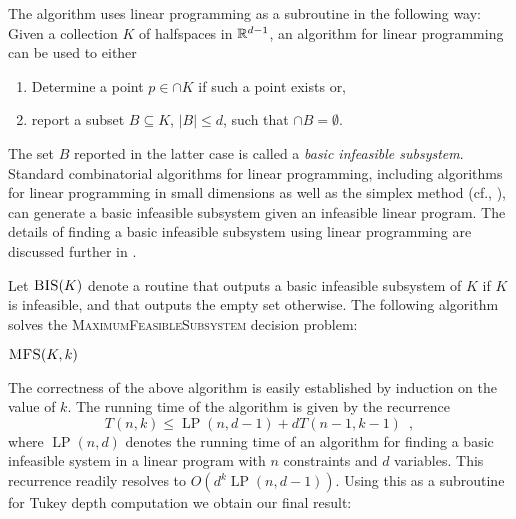 \documentclass[charterfonts,lotsofwhite]{patmorin}
\DeclareMathOperator{\lp}{LP}
\begin{document}
The algorithm uses linear programming as a subroutine in the following
way:  Given a collection $K$ of halfspaces in $\mathbb{R}^{d-1}$, an algorithm
for linear programming can be used to either
\begin{enumerate}
\item Determine a point $p\in\cap K$ if such a point exists or,
\item report a subset $B\subseteq K$, $|B|\le d$, such that 
	$\cap B=\emptyset$.
\end{enumerate}
The set $B$ reported in the latter case is called a \emph{basic
infeasible subsystem}.  Standard combinatorial algorithms for linear
programming, including algorithms for linear programming in small
dimensions \cite{c95,d84,m83,m84,s91,sw92} as well as the simplex
method (cf., \cite{chvatal80}), can generate a basic infeasible
subsystem given an infeasible linear program.  The details of finding
a basic infeasible subsystem using linear programming are discussed
further in .

Let $\textsc{BIS}(K)$ denote a routine that outputs a basic infeasible
subsystem of $K$ if $K$ is infeasible, and that outputs the empty set
otherwise.  The following algorithm solves the
\textsc{MaximumFeasibleSubsystem} decision problem:

\noindent\begin{minipage}{\textwidth}
\noindent$\textsc{MFS}(K,k)$
\begin{algorithmic}[1]
\ENDIF
{}
\ENDIF
{}
   \ENDIF
\ENDFOR
{}
\end{algorithmic}
\end{minipage}

The correctness of the above algorithm is easily established by
induction on the value of $k$.  The running time of the algorithm is
given by the recurrence
\[
    T(n,k) \le \lp(n,d-1)+ dT(n-1,k-1) \enspace ,
\]
where $\lp(n,d)$ denotes the running time of an algorithm for finding
a basic infeasible system in a linear program with $n$ constraints and
$d$ variables.  This recurrence readily resolves to
$O(d^k\lp(n,d-1))$.  
Using this as a subroutine for Tukey depth computation we obtain our
final result:
\end{document}
